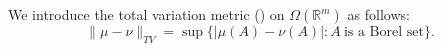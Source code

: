 \documentclass{amsproc}
\newtheorem{theorem}{Theorem}[section]
\theoremstyle{definition}
\theoremstyle{remark}
\numberwithin{equation}{section}
\begin{document}
We introduce the total variation metric (\cite{Parth}) on $\Omega( \mathbb{R}^m)$ as follows:
\[
\|\mu - \nu\|_{TV}=\sup\{|\mu(A)- \nu (A)|: A ~\text{is a Borel set}\}.
\]
\end{document}
